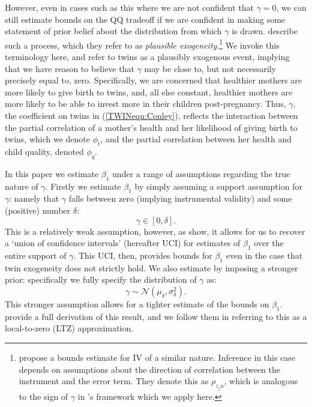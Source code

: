 However, even in cases such as this where we are not confident that $\gamma=0$,
we can still estimate bounds on the QQ tradeoff if we are confident in making
some statement of prior belief about the distribution from which $\gamma$ is 
drawn.  \citet{Conleyetal2012} describe such a process, which they refer to as 
\emph{plausible exogeneity}.\footnote{\citet{NevoRosen2012} propose a bounds
estimate for IV of a similar nature.  Inference in this case depends on 
assumptions about the direction of correlation between the instrument and the 
error term. They denote this as $\rho_{z_{j}u}$, which is analogous to the sign 
of $\gamma$ in \citeauthor{Conleyetal2012}'s framework which we apply here.} We 
invoke this terminology here, and refer to twins as a plausibly exogenous event, 
implying that we have reason to believe that $\gamma$ may be close to, but not 
necessarily precisely equal to, zero. Specifically, we are concerned that 
healthier mothers are more likely to give birth to twins, and, all else 
constant, healthier mothers are more likely to be able to invest more in their 
children post-pregnancy.  Thus, $\gamma$, the coefficient on twins in 
(\ref{TWINeqn:Conley}), reflects the interaction between the partial correlation 
of a mother's health and her likelihood of giving birth to twins, which we 
denote $\phi_t$, and the partial correlation between her health and child 
quality, denoted $\phi_q$.

In this paper we estimate $\beta_1$ under a range of assumptions regarding the
true nature of $\gamma$.  Firstly we estimate $\beta_1$ by simply assuming a
support assumption for $\gamma$: namely that $\gamma$ falls between zero 
(implying instrumental validity) and some (positive) number $\delta$:
\begin{equation}
\label{TWINeqn:uci}
\gamma \in [0,\delta].
\end{equation}
This is a relatively weak assumption, however, as \citet{Conleyetal2012} show,
it allows for us to recover a `union of confidence intervals' (hereafter UCI) 
for estimates of $\beta_1$ over the entire support of $\gamma$.  This UCI, then, 
provides bounds for $\beta_1$ even in the case that twin exogeneity does not 
strictly hold. We also estimate by imposing a stronger prior: specifically we 
fully specify the distribution of $\gamma$ as:
\begin{equation}
\label{TWINeqn:ltz}
\gamma \sim \mathcal{N}(\mu_\delta,\sigma^2_\delta).
\end{equation}
This stronger assumption allows for a tighter estimate of the bounds on 
$\beta_1$.  \citet{Conleyetal2012} provide a full derivation of this result, and 
we follow them in referring to this as a local-to-zero (LTZ) approximation.

